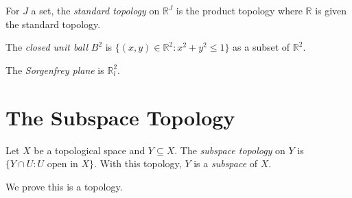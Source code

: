\begin{df}
  For $J$ a set, the \emph{standard topology} on $\mathbb{R}^J$ is the
  product topology where $\mathbb{R}$ is given the standard topology.
\end{df}

\begin{df}
  The \emph{closed unit ball} $B^2$ is $\{ (x, y) \in \mathbb{R}^2 : x^2 +
  y^2 \leq 1 \}$ as a subset of $\mathbb{R}^2$.
\end{df}

 \begin{df}
 The \emph{Sorgenfrey plane} is $\mathbb{R}_l^2$.
\end{df}

\section{The Subspace Topology}

\begin{df}
  Let $X$ be a topological space and $Y \subseteq X$. The \emph{subspace
    topology} on $Y$ is $\{ Y \cap U : U \text{ open in } X \}$. With this
  topology, $Y$ is a \emph{subspace} of $X$.

  We prove this is a topology.
\end{df}

